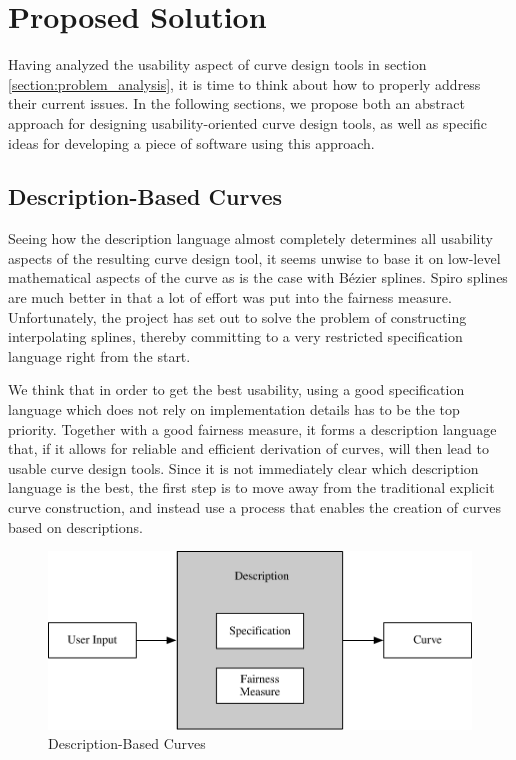 \documentclass[a4paper]{article}
\begin{document}
	\section{Proposed Solution}
	\label{section:proposed_solution}

		Having analyzed the usability aspect of curve design tools in section \ref{section:problem_analysis}, it is time to think about how to properly address their current issues. In the following sections, we propose both an abstract approach for designing usability-oriented curve design tools, as well as specific ideas for developing a piece of software using this approach.
          
		\subsection{Description-Based Curves}
		\label{section:description-based_curves}

			Seeing how the description language almost completely determines all usability aspects of the resulting curve design tool, it seems unwise to base it on low-level mathematical aspects of the curve as is the case with Bézier splines. Spiro splines are much better in that a lot of effort was put into the fairness measure. Unfortunately, the project has set out to solve the problem of constructing interpolating splines, thereby committing to a very restricted specification language right from the start.

			We think that in order to get the best usability, using a good specification language which does not rely on implementation details has to be the top priority. Together with a good fairness measure, it forms a description language that, if it allows for reliable and efficient derivation of curves, will then lead to usable curve design tools. Since it is not immediately clear which description language is the best, the first step is to move away from the traditional explicit curve construction, and instead use a process that enables the creation of curves based on descriptions.

			\begin{figure}[htb]
				\centering
				\includegraphics[width=115mm]{content/output/description-based_curves.pdf}
				\caption{Description-Based Curves}
				\label{figure:description-based_curves}
			\end{figure}
\end{document}
